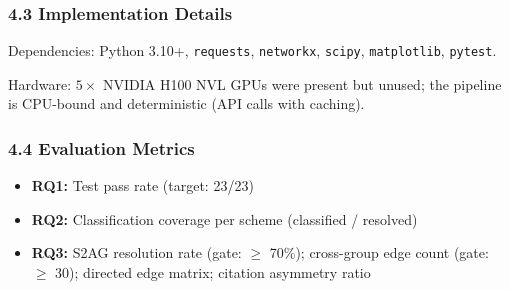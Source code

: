 \subsubsection{4.3 Implementation Details}

\begin{table}[htbp]
\centering
{}
\end{table}

Dependencies: Python 3.10+, \texttt{requests}, \texttt{networkx}, \texttt{scipy}, \texttt{matplotlib}, \texttt{pytest}.

Hardware: $5\times$ NVIDIA H100 NVL GPUs were present but unused; the pipeline is CPU-bound and deterministic (API calls with caching).

\subsubsection{4.4 Evaluation Metrics}

\begin{itemize}
\item \textbf{RQ1:} Test pass rate (target: 23/23)
\item \textbf{RQ2:} Classification coverage per scheme (classified / resolved)
\item \textbf{RQ3:} S2AG resolution rate (gate: $\geq$ 70\%); cross-group edge count (gate: $\geq$ 30); directed edge matrix; citation asymmetry ratio
\end{itemize}

